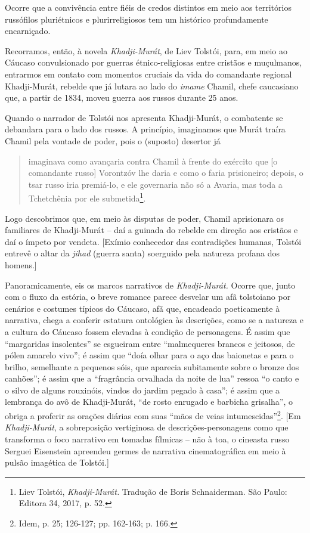 Ocorre que a convivência entre fiéis de credos distintos em meio aos
territórios russófilos pluriétnicos e plurirreligiosos tem um histórico
profundamente encarniçado.

Recorramos, então, à novela \emph{Khadji-Murát}, de Liev Tolstói, para,
em meio ao Cáucaso convulsionado por guerras étnico-religiosas entre
cristãos e muçulmanos, entrarmos em contato com momentos cruciais da
vida do comandante regional Khadji-Murát, rebelde que já lutara ao lado
do \emph{imame} Chamil, chefe caucasiano que, a partir de 1834, moveu
guerra aos russos durante 25 anos.

Quando o narrador de Tolstói nos apresenta Khadji-Murát, o combatente se
debandara para o lado dos russos. A princípio, imaginamos que Murát
traíra Chamil pela vontade de poder, pois o (suposto) desertor já

\begin{quote}
imaginava como avançaria contra Chamil à frente do exército que {[}o
comandante russo{]} Vorontzóv lhe daria e como o faria prisioneiro;
depois, o tsar russo iria premiá-lo, e ele governaria não só a Avaria,
mas toda a Tchetchênia por ele submetida\footnote{Liev Tolstói,
  \emph{Khadji-Murát.} Tradução de Boris Schnaiderman. São Paulo:
  Editora 34, 2017, p. 52.}.
\end{quote}

Logo descobrimos que, em meio às disputas de poder, Chamil aprisionara
os familiares de Khadji-Murát -- daí a guinada do rebelde em direção aos
cristãos e daí o ímpeto por vendeta. {[}Exímio conhecedor das
contradições humanas, Tolstói entrevê o altar da \emph{jihad} (guerra
santa) soerguido pela natureza profana dos homens.{]}

Panoramicamente, eis os marcos narrativos de \emph{Khadji-Murát.} Ocorre
que, junto com o fluxo da estória, o breve romance parece desvelar um
afã tolstoiano por cenários e costumes típicos do Cáucaso, afã que,
encadeado poeticamente à narrativa, chega a conferir estatura ontológica
às descrições, como se a natureza e a cultura do Cáucaso fossem elevadas
à condição de personagens. É assim que ``margaridas insolentes'' se
esgueiram entre ``malmequeres brancos e jeitosos, de pólen amarelo
vivo''; é assim que ``doía olhar para o aço das baionetas e para o
brilho, semelhante a pequenos sóis, que aparecia subitamente sobre o
bronze dos canhões''; é assim que a ``fragrância orvalhada da noite de
lua'' ressoa ``o canto e o silvo de alguns rouxinóis, vindos do jardim
pegado à casa''; é assim que a lembrança do avô de Khadji-Murát, ``de
rosto enrugado e barbicha grisalha'', o obriga a proferir as orações
diárias com suas ``mãos de veias intumescidas''\footnote{Idem, p. 25;
  126-127; pp. 162-163; p. 166.}. {[}Em \emph{Khadji-Murát}, a
sobreposição vertiginosa de descrições-personagens como que transforma o
foco narrativo em tomadas fílmicas -- não à toa, o cineasta russo
Serguei Eisenstein apreendeu germes de narrativa cinematográfica em meio
à pulsão imagética de Tolstói.{]}

